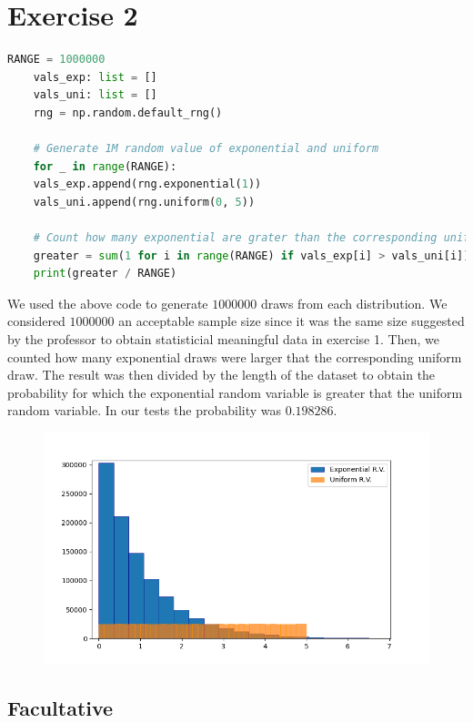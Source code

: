 \documentclass[10pt,a4paper]{article}
\begin{document}
\section*{Exercise 2}
\begin{center}
  \begin{lstlisting}[language=python]
    RANGE = 1000000
    vals_exp: list = []
    vals_uni: list = []
    rng = np.random.default_rng()
    
    # Generate 1M random value of exponential and uniform
    for _ in range(RANGE):
    vals_exp.append(rng.exponential(1))
    vals_uni.append(rng.uniform(0, 5))
    
    # Count how many exponential are grater than the corresponding uniform
    greater = sum(1 for i in range(RANGE) if vals_exp[i] > vals_uni[i])
    print(greater / RANGE)
  \end{lstlisting}
\end{center}
We used the above code to generate \(1000000\) draws from each distribution. We considered \(1000000\) an acceptable sample size since it was the same size suggested by the professor to obtain statisticial meaningful data in exercise 1.  Then, we counted how many exponential draws were larger that the corresponding uniform draw. The result was then divided by the length of the dataset to obtain the probability for which the exponential random variable is greater that the uniform random variable. In our tests the probability was \(0.198286\).

\begin{figure}[h]
  \centering
  \includegraphics[scale=0.4]{exercise-2-hist.png}
\end{figure}

\subsection*{Facultative}
\end{document}
